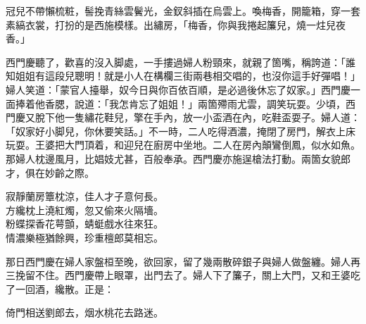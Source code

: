 \begin{myquote} 
冠兒不帶懶梳粧，髻挽青絲雲鬢光，金釵斜插在烏雲上。喚梅香，開籠箱，穿一套素縞衣裳，打扮的是西施模樣。出繡房，「梅香，你與我捲起簾兒，燒一炷兒夜香。」{}
\end{myquote} 

西門慶聽了，歡喜的沒入脚處，一手摟過婦人粉頸來，就親了箇嘴，稱誇道：「誰知姐姐有這段兒聰明！就是小人在構欄三街兩巷相交唱的，也沒你這手好彈唱！」婦人笑道：「蒙官人擡舉，奴今日與你百依百順，是必過後休忘了奴家。」西門慶一面捧着他香腮，說道：「我怎肯忘了姐姐！」兩箇殢雨尤雲，調笑玩耍。少頃，西門慶又脫下他一隻繡花鞋兒，擎在手內，放一小盃酒在內，吃鞋盃耍子。{}婦人道：「奴家好小脚兒，你休要笑話。」不一時，二人吃得酒濃，掩閉了房門，解衣上床玩耍。王婆把大門頂着，和迎兒在廚房中坐地。二人在房內顛鸞倒鳳，似水如魚。那婦人枕邊風月，比娼妓尤甚，百般奉承。西門慶亦施逞槍法打動。兩箇女貌郎才，俱在妙齡之際。

\begin{myquote} 
寂靜蘭房簟枕涼，佳人才子意何長。\\方纔枕上澆紅燭，忽又偷來火隔墻。\\粉蝶探香花萼顫，蜻蜓戲水往來狂。\\情濃樂極猶餘興，珍重檀郎莫相忘。
\end{myquote} 

那日西門慶在婦人家盤桓至晚，欲回家，留了幾兩散碎銀子與婦人做盤纏。婦人再三挽留不住。西門慶帶上眼罩，出門去了。婦人下了簾子，關上大門，又和王婆吃了一回酒，纔散。正是：

\begin{myquote} 
倚門相送劉郎去，烟水桃花去路迷。
\end{myquote} 

